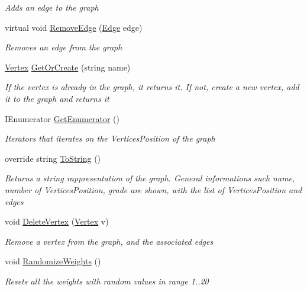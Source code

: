 \begin{DoxyCompactItemize}
\begin{DoxyCompactList}\small\item\em Adds an edge to the graph \end{DoxyCompactList}\item 
virtual void \hyperlink{class_graph_1_1_graph_a0b49bbae104d612158d6bbef9083d453}{Remove\+Edge} (\hyperlink{class_graph_1_1_edge}{Edge} edge)
\begin{DoxyCompactList}\small\item\em Removes an edge from the graph \end{DoxyCompactList}\item 
\hyperlink{class_graph_1_1_vertex}{Vertex} \hyperlink{class_graph_1_1_graph_ac68594326ba5c47cc44b0130bba6f924}{Get\+Or\+Create} (string name)
\begin{DoxyCompactList}\small\item\em If the vertex is already in the graph, it returns it. If not, create a new vertex, add it to the graph and returns it \end{DoxyCompactList}\item 
I\+Enumerator \hyperlink{class_graph_1_1_graph_a2588304efcfecc95d96afc3788a0288b}{Get\+Enumerator} ()
\begin{DoxyCompactList}\small\item\em Iterators that iterates on the Vertices\+Position of the graph \end{DoxyCompactList}\item 
override string \hyperlink{class_graph_1_1_graph_a156e417443003071243e2a22ba0a1533}{To\+String} ()
\begin{DoxyCompactList}\small\item\em Returns a string rappresentation of the graph. General informations such name, number of Vertices\+Position, grade are shown, with the list of Vertices\+Position and edges \end{DoxyCompactList}\item 
void \hyperlink{class_graph_1_1_graph_a0c9eb0d791d58368f214cbb96ac2a320}{Delete\+Vertex} (\hyperlink{class_graph_1_1_vertex}{Vertex} v)
\begin{DoxyCompactList}\small\item\em Remove a vertex from the graph, and the associated edges \end{DoxyCompactList}\item 
void \hyperlink{class_graph_1_1_graph_a4c16783a84526b65e8447f7061b38140}{Randomize\+Weights} ()
\begin{DoxyCompactList}\small\item\em Resets all the weights with random values in range 1..20 \end{DoxyCompactList}\item 

\end{DoxyCompactItemize}
